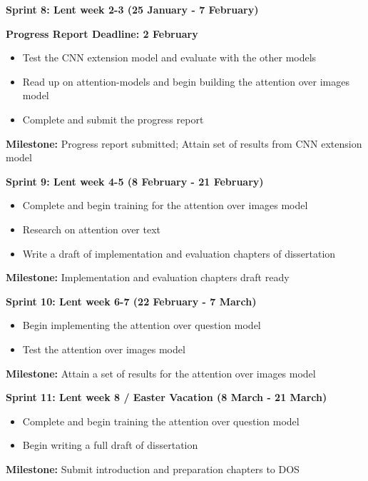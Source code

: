 \documentclass[12pt,a4paper,twoside]{article}
\begin{document}
\noindent\textbf{Sprint 8: Lent week 2-3 (25 January - 7 February)}
\begin{addmargin}[3em]{0em}
	\noindent\textbf{Progress Report Deadline: 2 February}
	\setlength{\parskip}{0em}
	\begin{itemize}
		\setlength\itemsep{0em}
		\item Test the CNN extension model and evaluate with the other models
		\item Read up on attention-models and begin building the attention over images model
		\item Complete and submit the progress report
	\end{itemize}
	\noindent\textbf{Milestone:} Progress report submitted; Attain set of results from CNN extension model
	\setlength{\parskip}{1em}
\end{addmargin}

\noindent\textbf{Sprint 9: Lent week 4-5 (8 February - 21 February)}
\begin{addmargin}[3em]{0em}
	\begin{itemize}
		\setlength\itemsep{0em}
		\item Complete and begin training for the attention over images model
		\item Research on attention over text
		\item Write a draft of implementation and evaluation chapters of dissertation
	\end{itemize}
	\noindent\textbf{Milestone:} Implementation and evaluation chapters draft ready
	\setlength{\parskip}{1em}
\end{addmargin}

\noindent\textbf{Sprint 10: Lent week 6-7 (22 February - 7 March)}
\begin{addmargin}[3em]{0em}
	\begin{itemize}
		\setlength\itemsep{0em}
		\item Begin implementing the attention over question model
		\item Test the attention over images model
		
	\end{itemize}
	\noindent\textbf{Milestone:} Attain a set of results for the attention over images model
	\setlength{\parskip}{1em}
\end{addmargin}

\noindent\textbf{Sprint 11: Lent week 8 / Easter Vacation (8 March - 21 March)}
\begin{addmargin}[3em]{0em}
	\begin{itemize}
		\setlength\itemsep{0em}
		\item Complete and begin training the attention over question model
		\item Begin writing a full draft of dissertation
	\end{itemize}
	\noindent\textbf{Milestone:} Submit introduction and preparation chapters to DOS
	\setlength{\parskip}{1em}
\end{addmargin}
\end{document}
